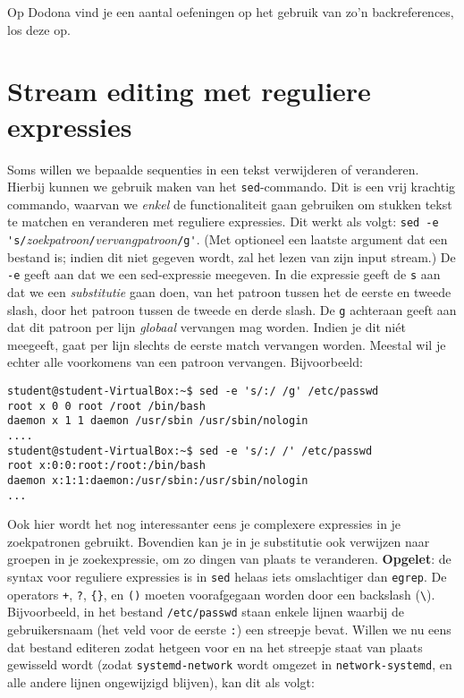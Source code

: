 \documentclass[a4paper,twoside,openany]{memoir}
\begin{document}
Op Dodona vind je een aantal oefeningen op het gebruik van zo'n backreferences,
los deze op.

\section{Stream editing met reguliere expressies}

Soms willen we bepaalde sequenties in een tekst verwijderen of veranderen.
Hierbij kunnen we gebruik maken van het \verb!sed!-commando. Dit is een vrij
krachtig commando, waarvan we \emph{enkel} de functionaliteit gaan gebruiken om
stukken tekst te matchen en veranderen met reguliere expressies. Dit werkt als
volgt: \verb!sed -e 's/!\emph{zoekpatroon}\verb!/!\emph{vervangpatroon}\verb!/g'!. (Met optioneel
een laatste argument dat een bestand is; indien dit niet gegeven wordt, zal het
lezen van zijn input stream.) De \verb!-e! geeft aan dat we een sed-expressie
meegeven. In die expressie geeft de \verb!s! aan dat we een \emph{substitutie}
gaan doen, van het patroon tussen het de eerste en tweede slash, door het
patroon tussen de tweede en derde slash. De \verb!g! achteraan geeft aan dat dit
patroon per lijn \emph{globaal} vervangen mag worden. Indien je dit niét
meegeeft, gaat per lijn slechts de eerste match vervangen worden. Meestal wil je
echter alle voorkomens van een patroon vervangen. Bijvoorbeeld:

\begin{verbatim}
student@student-VirtualBox:~$ sed -e 's/:/ /g' /etc/passwd
root x 0 0 root /root /bin/bash
daemon x 1 1 daemon /usr/sbin /usr/sbin/nologin
....
student@student-VirtualBox:~$ sed -e 's/:/ /' /etc/passwd
root x:0:0:root:/root:/bin/bash
daemon x:1:1:daemon:/usr/sbin:/usr/sbin/nologin
...
\end{verbatim}

Ook hier wordt het nog interessanter eens je complexere expressies in je
zoekpatronen gebruikt. Bovendien kan je in je substitutie ook verwijzen naar
groepen in je zoekexpressie, om zo dingen van plaats te veranderen.
\textbf{Opgelet}: de syntax voor reguliere expressies is in \verb!sed! helaas
iets omslachtiger dan \verb!egrep!. De operators \verb!+!, \verb!?!, \verb!{}!,
en \verb!()! moeten voorafgegaan worden door een backslash (\verb!\!).
Bijvoorbeeld, in het bestand \verb!/etc/passwd! staan enkele lijnen waarbij de
gebruikersnaam (het veld voor de eerste \verb!:!) een streepje bevat. Willen we
nu eens dat bestand editeren zodat hetgeen voor en na het streepje staat van
plaats gewisseld wordt (zodat \verb!systemd-network! wordt omgezet in
\verb!network-systemd!, en alle andere lijnen ongewijzigd blijven), kan dit als
volgt:
\end{document}
